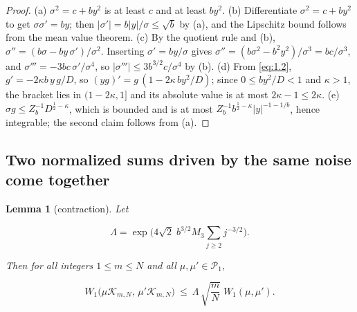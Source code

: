 \documentclass[aip,jmp,preprint,onecolumn,floatfix,superscriptaddress,nofootinbib,11pt]{revtex4-2}
\theoremstyle{plain}
\newtheorem{lemma}{Lemma}
\theoremstyle{remark}
\numberwithin{equation}{section}
\begin{document}
\begin{proof} (a) $\sigma^{2}=c+by^{2}$ is at least $c$ and at least $by^{2}$. (b) Differentiate $\sigma^{2}=c+by^{2}$ to get $\sigma\sigma'=by$; then $|\sigma'|=b|y|/\sigma\le\sqrt b$ by (a), and the Lipschitz bound follows from the mean value theorem. (c) By the quotient rule and (b), $\sigma''=(b\sigma-by\,\sigma')/\sigma^{2}$. Inserting $\sigma'=by/\sigma$ gives $\sigma''=(b\sigma^{2}-b^{2}y^{2})/\sigma^{3}=bc/\sigma^{3}$, and $\sigma'''=-3bc\,\sigma'/\sigma^{4}$, so $|\sigma'''|\le3b^{3/2}c/\sigma^{4}$ by (b). (d) From \eqref{eq:1.2}, $g'=-2\kappa b\,y\,g/D$, so $(yg)'=g\,(1-2\kappa\,by^{2}/D)$; since $0\le by^{2}/D<1$ and $\kappa>1$, the bracket lies in $(1-2\kappa,1]$ and its absolute value is at most $2\kappa-1\le2\kappa$. (e) $\sigma g\le Z_b^{-1}D^{\frac12-\kappa}$, which is bounded and is at most $Z_b^{-1}b^{\frac12-\kappa}|y|^{-1-1/b}$, hence integrable; the second claim follows from (a). 
\end{proof}

\subsection{Two normalized sums driven by the same noise come together}\label{sec:4_4}

\begin{lemma}[contraction]

Let

\begin{equation}
\Lambda=\exp\Big(4\sqrt2\;b^{3/2}M_3\sum_{j\ge2}j^{-3/2}\Big).
\label{eq:4.4}
\end{equation}

Then for all integers $1\le m\le N$ and all $\mu,\mu'\in\mathcal P_1$,

\begin{equation}
W_1\big(\mu \mathcal K_{m,N},\,\mu' \mathcal K_{m,N}\big)\ \le\ \Lambda\,\sqrt{\frac mN}\;W_1(\mu,\mu').
\label{eq:4.5}
\end{equation}

\end{lemma}
\end{document}
